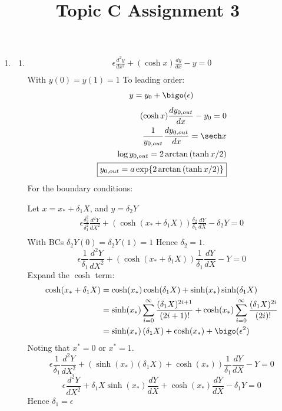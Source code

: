 \documentclass{/home/janmebows/Documents/LatexTemplates/myassignment}
\title{Topic C Assignment 3}
\begin{document}
\maketitle
\begin{enumerate}
	\item \begin{enumerate}
		\item 
		\begin{align*}
			\epsilon \frac{d^2y}{dx^2} + (\cosh x) \frac{dy}{dx} - y= 0\\
		\end{align*}
		With $y(0)=y(1)=1$
		To leading order:
		\[y = y_0 + \bigo(\epsilon)\]
		\begin{align*}
			(\cosh x)\frac{dy_{0,out}}{dx} - y_0 = 0\\
			\frac{1}{y_{0,out}}\frac{dy_{0,out}}{dx} = \sech x \\
			\log y_{0,out} = 2\arctan\left(\tanh x/2\right)\\
			\boxed{y_{0,out} = a\exp\{2\arctan\left(\tanh x/2\right)\}}
		\end{align*}
		For the boundary conditions:
		
		Let $x = x_* + \delta_1 X$, and $y = \delta_2 Y$
		\begin{align*}
			\epsilon \frac{\delta_2^2}{\delta_1^2}\frac{d^2Y}{dX^2} + (\cosh(x_* + \delta_1 X))\frac{\delta_2}{\delta_1} \frac{dY}{dX} - \delta_2 Y= 0\\
		\end{align*}
		With BCs $\delta_2 Y(0) = \delta_2 Y(1) = 1$ Hence $\delta_2 = 1$.
		\[\epsilon \frac{1}{\delta_1}\frac{d^2Y}{dX^2} + (\cosh(x_* + \delta_1 X))\frac1{\delta_1} \frac{dY}{dX} - Y= 0\]
		Expand the $\cosh$ term:
		\begin{align*}
			\cosh (x_*+\delta_1 X) &= \cosh(x_*)\cosh(\delta_1X) + \sinh(x_*)\sinh(\delta_1X)\\
			&=\sinh(x_*)\sum_{i=0}^\infty \frac{(\delta_1 X)^{2i+1}}{(2i+1)!}   + \cosh(x_*)\sum_{i=0}^\infty \frac{(\delta_1 X)^{2i}}{(2i)!}\\
			&= \sinh(x_*)\left(\delta_1 X\right) + \cosh(x_*) + \bigo(\epsilon^2) 
		\end{align*}
		Noting that $x^* = 0$ or $x^* =1$.
		\[\epsilon \frac{1}{\delta_1}\frac{d^2Y}{dX^2} + (\sinh(x_*)\left(\delta_1 X\right) + \cosh(x_*))\frac1{\delta_1} \frac{dY}{dX} - Y= 0\]
		\[\epsilon\frac{d^2Y}{dX^2} +  \delta_1 X \sinh(x_*)\frac{dY}{dX} + \cosh(x_*)\frac{dY}{dX} - \delta_1 Y= 0\]
		Hence $\delta_1 = \epsilon$


\end{enumerate}
\end{enumerate}
\end{document}
